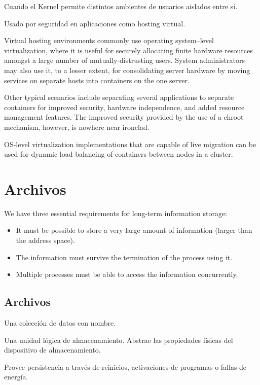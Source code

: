 \documentclass[a4paper, twoside]{article}
\begin{document}
Cuando el Kernel permite distintos ambientes de usuarios aislados entre sí.

Usado por seguridad en aplicaciones como hosting virtual.

Virtual hosting environments commonly use operating system–level virtualization, where it is useful for securely allocating finite hardware resources amongst a large number of mutually-distrusting users. System administrators may also use it, to a lesser extent, for consolidating server hardware by moving services on separate hosts into containers on the one server.

Other typical scenarios include separating several applications to separate containers for improved security, hardware independence, and added resource management features. The improved security provided by the use of a chroot mechanism, however, is nowhere near ironclad.

OS-level virtualization implementations that are capable of live migration can be used for dynamic load balancing of containers between nodes in a cluster.

\newpage
\section{Archivos}
We have three essential requirements for long-term information storage:
\begin{itemize}
	\item It must be possible to store a very large amount of information (larger than the address space).
	\item The information must survive the termination of the process using it.
	\item Multiple processes must be able to access the information concurrently.
\end{itemize}

\subsection{Archivos}
Una colección de datos con nombre.

Una unidad lógica de almacenamiento. Abstrae las propiedades físicas del dispositivo de almacenamiento.

Provee persistencia a través de reinicios, activaciones de programas o fallas de energía.\\
\end{document}
